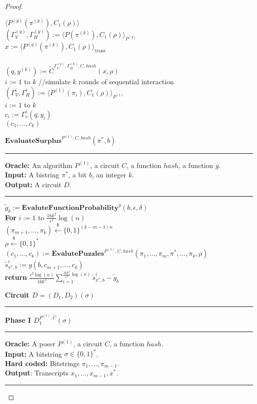 \begin{proof}
\begin{codeblock}
  \Run $\langle P^{(g)}(\pi^{(k)}), C_1(\rho) \rangle$ \\
  \IndI $(\Gamma_V^{(g)}, \Gamma_H^{(g)}) := \langle P(\pi^{(k)}), C_1(\rho) \rangle_{P^{(g)}}$ \\
  \IndI $x := \langle P^{(g)}(\pi^{(k)}), C_1(\rho) \rangle_{\text{trans}}$ \\ \\
  $(q,y^{(k)}) := \widetilde{C}^{\Gamma_V^{(g)}, \Gamma_H^{(k)}, C, hash}(x, \rho)$\\
  \For $i:=1$ to $k$ \Do \IndII //simulate $k$ rounds of sequential interaction \\
  \IndI $(\Gamma_V^{i}, \Gamma_H^{i}) := \langle P^{(1)}(\pi_i), C_1(\rho) \rangle_{P^{(1)}} $\\
  \For $i:=1$ to $k$ \Do \\
  \IndI $c_i := \Gamma_v^{i}(q, y_i)$\\
  \return $(c_1, \dots, c_k)$
\end{codeblock}
%
\begin{codeblock}
  $\textbf{EvaluateSurplus}^{P^{(1)}, C, hash}(\pi^*, b)$
  \medskip
  \hrule
  \medskip
  \textbf{Oracle:} An algorithm $P^{(1)}$, a circuit $C$, a function $hash$, a function $g$.\\
  \textbf{Input:} A bistring $\pi^*$, a bit $b$, an integer $k$.\\
  \textbf{Output:} A circuit $D$.
  \medskip\hrule\medskip
  $\widetilde{g}_b := \textbf{EvaluteFunctionProbability}^{g}(b, \epsilon, \delta)$ \\
  \textbf{For} $i:=1$ to $\frac{16k^2}{\epsilon^2}\log(n)$ \Do \\
  \IndI $(\pi_{m+1}, \dots, \pi_k) \xleftarrow{\$} \{0,1\}^{(k-m-1)n}$\\
  \IndI $\rho \xleftarrow{\$} \{0,1\}^{*}$\\
  \IndI $(c_1, \dots, c_k) := \textbf{EvalutePuzzles}^{P^{(1)}, C, hash}(\pi_1, \dots, \pi_{m}, \pi^*, \dots, \pi_k, \rho)$\\
  \IndI $\widetilde{s}_{\pi^*,b}^i := g(b, c_{m+1}, \dots, c_k)$\\
  \textbf{return} $\frac{\epsilon^2\log(n)}{16k^2} \sum_{i=1}^{\frac{16k^2}{\epsilon^2}\log(n)} \widetilde{s}_{\pi^*,b}^i - \widetilde{g}_b$\\
\end{codeblock}
%
\begin{codeblock}
  \textbf{Circuit $D = (D_1, D_2) (\sigma)$}
  \medskip \hrule \medskip
  \textbf{Phase I $D_1^{P^{(1)}, C}(\sigma)$}
  \medskip \hrule \medskip
  \textbf{Oracle:} A poser $P^{(1)}$, a circuit $C$, a function $hash$.\\
  \textbf{Input:} A bitstring $\sigma \in \{0,1\}^{*}$.\\
  \textbf{Hard coded:} Bitstrings $\pi_1, \dots, \pi_{m-1}$. \\
  \textbf{Output}: Transcripts $x_1, \dots, x_{m-1}, x^*$.
  \medskip\hrule\medskip


\end{codeblock}
\end{proof}
